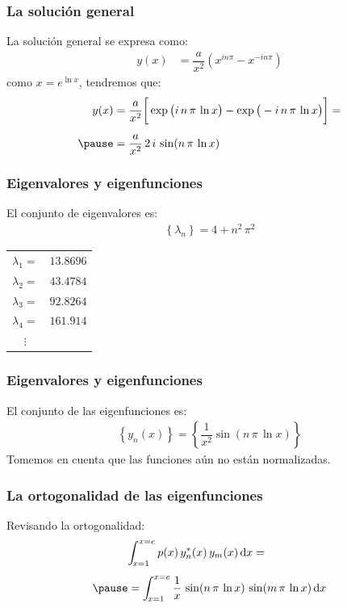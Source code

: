 \documentclass[12pt]{beamer}
\begin{document}
\begin{frame}
\frametitle{La solución general}
La solución general se expresa como:
\begin{align*}
y (x) &= \dfrac{a}{x^{2}} \left( x^{i n \pi} - x^{-i n \pi} \right)
\end{align*}
\pause
como $x = e^{\ln x}$, tendremos que:
\pause
\begin{eqnarray*}
\begin{aligned}
y (x) &= \dfrac{a}{x^{2}} \bigg[ \exp \big( i \, n \, \pi \, \ln x \big) -  \exp \big( - i \, n \, \pi \, \ln x \big) \bigg] = \\[0.5em] \pause
&= \dfrac{a}{x^{2}} \, 2 \, i \, \sin (n \, \pi \, \ln x)
\end{aligned}
\end{eqnarray*}
\end{frame}
\begin{frame}
\frametitle{Eigenvalores y eigenfunciones}
El conjunto de eigenvalores es:
\pause
\begin{align*}
\left\{ \lambda_{n} \right\} = 4 + n^{2} \, \pi^{2}
\end{align*}
\pause
\def\arraystretch{1}
\begin{tabular}{c c}
$\lambda_{1} =$ & $13.8696$ \\
$\lambda_{2} =$ & $43.4784$ \\
$\lambda_{3} =$ & $92.8264$ \\
$\lambda_{4} =$ & $161.914$ \\
$\vdots$
\end{tabular}
\end{frame}
\begin{frame}
\frametitle{Eigenvalores y eigenfunciones}
El conjunto de las eigenfunciones es:
\pause
\begin{align*}
\left\{ y_{n} (x) \right\} = \left\{ \dfrac{1}{x^{2}} \sin (n \, \pi \, \ln x) \right\}
\end{align*}
Tomemos en cuenta que las funciones aún no están normalizadas.
\end{frame}
\begin{frame}
\frametitle{La ortogonalidad de las eigenfunciones}
Revisando la ortogonalidad:
\pause
\begin{eqnarray*}
\begin{aligned}
&\scaleint{5ex}_{\bs x=1}^{x=e} \, p (x) \, y_{n}^{*} (x) \, y_{m}(x) \dd{x} = \\[0.5em] \pause
&= \scaleint{5ex}_{\bs x=1}^{x=e} \, \dfrac{1}{x} \, \sin (n \, \pi  \, \ln x) \, \sin (m \, \pi  \, \ln x) \dd{x}
\end{aligned}
\end{eqnarray*}
\pause
\end{frame}
\end{document}
